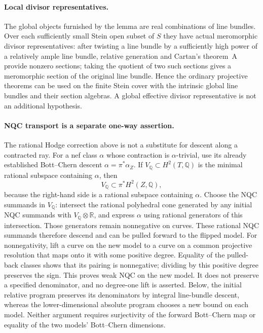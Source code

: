 \paragraph{Local divisor representatives.}
The global objects furnished by the lemma are real combinations of
line bundles. Over each sufficiently small Stein open subset of $S$
they have actual meromorphic divisor representatives: after twisting a
line bundle by a sufficiently high power of a relatively ample line
bundle, relative generation and Cartan's theorem~A provide nonzero
sections; taking the quotient of two such sections gives a meromorphic
section of the original line bundle. Hence the ordinary projective
theorems can be used on the finite Stein cover with the intrinsic
global line bundles and their section algebras. A global effective
divisor representative is not an additional hypothesis.

\paragraph{NQC transport is a separate one-way assertion.}
\label{repair:par:one-way-nqc}
The rational Hodge correction above is not a substitute for descent
along a contracted ray. For a nef class $\alpha$ whose contraction is
$\alpha$-trivial, use its already established Bott--Chern descent
$\alpha=\pi^*\alpha_Z$. If $V_{\mathbb Q}\subset H^2(T,\mathbb Q)$ is
the minimal rational subspace containing $\alpha$, then
\[
 V_{\mathbb Q}\subset\pi^*H^2(Z,\mathbb Q),
\]
because the right-hand side is a rational subspace containing
$\alpha$. Choose the NQC summands in $V_{\mathbb Q}$: intersect the
rational polyhedral cone generated by any initial NQC summands with
$V_{\mathbb Q}\otimes\mathbb R$, and express $\alpha$ using rational
generators of this intersection. Those generators remain nonnegative
on curves. These rational NQC summands therefore descend and can be
pulled forward to the flipped model. For nonnegativity, lift a curve
on the new model to a curve on a common projective resolution that
maps onto it with some positive degree. Equality of the pulled-back
classes shows that its pairing is nonnegative; dividing by this
positive degree preserves the sign. This proves weak NQC on the new
model. It does not preserve a specified denominator, and no
degree-one lift is asserted. Below, the initial relative program
preserves its denominators by integral line-bundle descent, whereas
the lower-dimensional absolute program chooses a new bound on each
model. Neither argument requires surjectivity of the forward
Bott--Chern map or equality of the two models' Bott--Chern dimensions.

